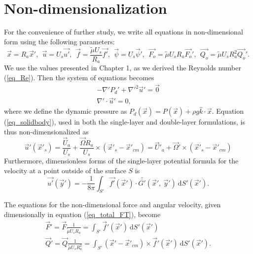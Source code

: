 \section{Non-dimensionalization}
\label{section3}
For the convenience of further study, we write all equations in non-dimensional form using the following parameters:
\begin{equation}
\vec{x} = R_a\vec{x}', 
\ \
 \vec{u} = U_s \vec{u'},
 \ \ 
  \vec{f} = \frac{\tilde{\mu} U_s}{R_a} \vec{f'},
  \ \ 
  \vec{\psi} = U_s \vec{\psi}',
  \ \ 
  \vec{F_o} = \tilde{\mu} U_s R_a \vec{F_o}',
  \ \
  \vec{Q_o} = \tilde{\mu} U_s R_a^2 \vec{Q_o}'.
\label{eq_nonD}
\end{equation}
We use the values presented in Chapter 1, as we derived the Reynolds number (\ref{eq_Re}). 
Then the system of equations becomes
\begin{align}
    -\nabla' P_d' +  \nabla'^2 \vec{u}'  = \vec{0}
	\label{eq_momentum_noD}
	\\
    \nabla' \cdot \vec{u}' = 0,
	\label{eq_conti_noD}
\end{align}
where we define the dynamic pressure as 
$P_d(\vec{x}) =  P(\vec{x}) + \rho g \hat{k} \cdot \vec{x}$.
Equation (\ref{eq_solidbody}), used in both the single-layer and double-layer formulations, is thus non-dimensionalized as 
\begin{equation}
  \vec{u}'(\vec{x}'_s) = \frac{\vec{U}_a}{U_s} +  \frac{\vec{\Omega}R_a}{U_s} \times (\vec{x}'_s - \vec{x}'_{cm}) = \vec{U}'_a +  \vec{\Omega}' \times (\vec{x}'_s - \vec{x}'_{cm})
  \label{eq_solidbody_nonD}
\end{equation}
Furthermore, dimensionless forms of the single-layer potential formula for the velocity at a point outside of the surface $S$ is 
\begin{equation}
    \vec{u'}(\vec{y}') =
	- \frac{1}{8 \pi}
	\int_{S'}  \vec{f'}(\vec{x}') \cdot \bar{\bar{G'}}(\vec{x}', \ \vec{y}') \ \text{d}S'(\vec{x}').
    \label{eq_BI_sl_ND}
\end{equation}
\par
The equations for the non-dimensional force and angular velocity, given dimensionally in equation (\ref{eq_total_FT}), become
\begin{align}
\vec{F}' =  \vec{F} \frac{1}{\tilde{\mu} U_s R_a}  =  \int_{S'} \vec{f}'(\vec{x}') \  \text{d}S'(\vec{x}')  
\label{eq_forcebal} 
\\  
 \vec{Q}' = \vec{Q} \frac{1}{\tilde{\mu} U_s R_a^2} =  \int_{S'} (\vec{x}' - \vec{x}'_{cm}) \times \vec{f}'(\vec{x}')  \ \text{d}S'(\vec{x}').  \label{eq_torquebal} 
\end{align}

